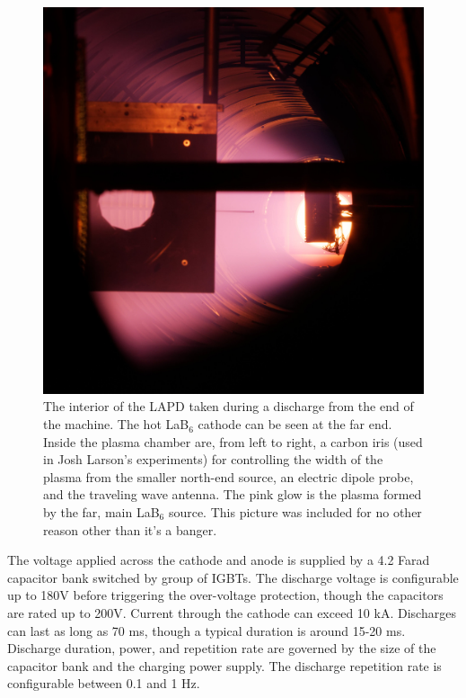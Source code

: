 \begin{figure}
	\centering
	\includegraphics[width=350pt]{figures/lapd_inside.jpg}
	\caption[Picture of LAPD interior]{\label{fig:lapd-inside}The interior of the LAPD taken during a discharge from the end of the machine. The hot LaB$_6$ cathode can be seen at the far end. Inside the plasma chamber are, from left to right, a carbon iris (used in Josh Larson's experiments) for controlling the width of the plasma from the smaller north-end source, an electric dipole probe, and the traveling wave antenna. The pink glow is the plasma formed by the far, main LaB$_6$ source. This picture was included for no other reason other than it's a banger.}
\end{figure}


The voltage applied across the cathode and anode is supplied by a 4.2 Farad capacitor bank switched by group of IGBTs. The discharge voltage is configurable up to 180V before triggering the over-voltage protection, though the capacitors are rated up to 200V. Current through the cathode can exceed 10 kA. Discharges can last as long as 70 ms, though a typical duration is around 15-20 ms. Discharge duration, power, and repetition rate are governed by the size of the capacitor bank and the charging power supply. The discharge repetition rate is configurable between 0.1 and 1 Hz.

